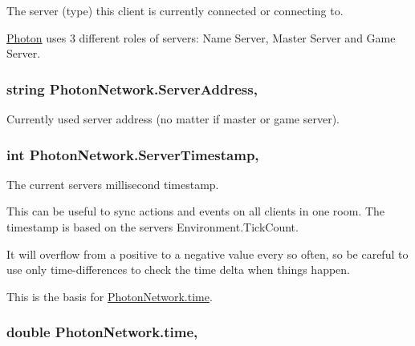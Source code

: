 The server (type) this client is currently connected or connecting to. 

\hyperlink{namespace_photon}{Photon} uses 3 different roles of servers\+: Name Server, Master Server and Game Server.
\subsubsection[{\texorpdfstring{Server\+Address}{ServerAddress}}]{\setlength{\rightskip}{0pt plus 5cm}string Photon\+Network.\+Server\+Address\hspace{0.3cm}{\ttfamily [static]}, {\ttfamily [get]}}\hypertarget{class_photon_network_a3b90d30007fbeced0293dde881d0421e}{}\label{class_photon_network_a3b90d30007fbeced0293dde881d0421e}


Currently used server address (no matter if master or game server).

\subsubsection[{\texorpdfstring{Server\+Timestamp}{ServerTimestamp}}]{\setlength{\rightskip}{0pt plus 5cm}int Photon\+Network.\+Server\+Timestamp\hspace{0.3cm}{\ttfamily [static]}, {\ttfamily [get]}}\hypertarget{class_photon_network_aa3c3ed1a8a1da54e52c5b7284f69c8a4}{}\label{class_photon_network_aa3c3ed1a8a1da54e52c5b7284f69c8a4}


The current server\textquotesingle{}s millisecond timestamp. 

This can be useful to sync actions and events on all clients in one room. The timestamp is based on the server\textquotesingle{}s Environment.\+Tick\+Count.

It will overflow from a positive to a negative value every so often, so be careful to use only time-\/differences to check the time delta when things happen.

This is the basis for \hyperlink{class_photon_network_a86ab96957666ef72830a35662ef3d30b}{Photon\+Network.\+time}. 
\subsubsection[{\texorpdfstring{time}{time}}]{\setlength{\rightskip}{0pt plus 5cm}double Photon\+Network.\+time\hspace{0.3cm}{\ttfamily [static]}, {\ttfamily [get]}}\hypertarget{class_photon_network_a86ab96957666ef72830a35662ef3d30b}{}\label{class_photon_network_a86ab96957666ef72830a35662ef3d30b}


